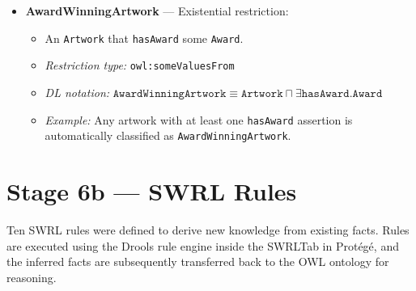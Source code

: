 \begin{itemize}
    \item \textbf{AwardWinningArtwork} — Existential restriction:
    \begin{itemize}
        \item An \texttt{Artwork} that \texttt{hasAward} some \texttt{Award}.
        \item \textit{Restriction type:} \texttt{owl:someValuesFrom}
        \item \textit{DL notation:} $\texttt{AwardWinningArtwork} \equiv \texttt{Artwork} \sqcap \exists\texttt{hasAward}.\texttt{Award}$
        \item \textit{Example:} Any artwork with at least one \texttt{hasAward} assertion is automatically classified as \texttt{AwardWinningArtwork}.
    \end{itemize}
\end{itemize}

\section*{Stage 6b — SWRL Rules}

Ten SWRL rules were defined to derive new knowledge from existing facts. Rules are executed using the Drools rule engine inside the SWRLTab in Protégé, and the inferred facts are subsequently transferred back to the OWL ontology for reasoning.

